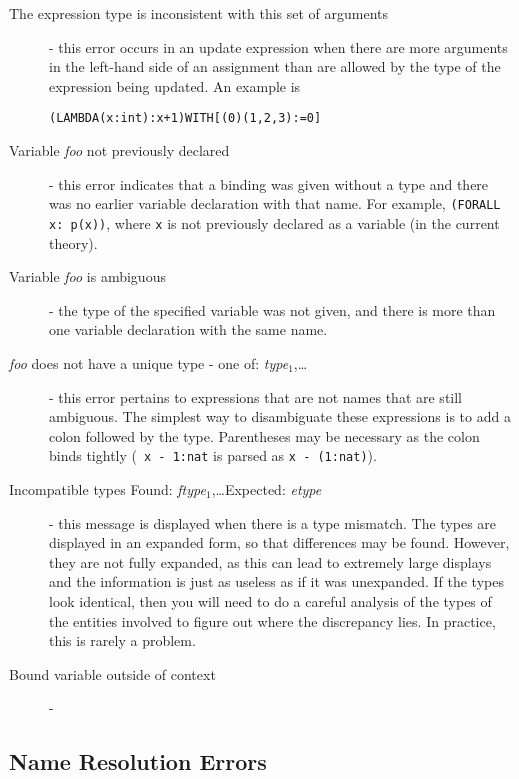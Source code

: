 \begin{description}
\item[The expression type is inconsistent with this set of arguments] -
this error occurs in an update expression when there are more arguments in
the left-hand side of an assignment than are allowed by the type of the
expression being updated.  An example is
{\small
\begin{alltt}
  (LAMBDA (x:int): x + 1) WITH [(0)(1,2,3) := 0]
\end{alltt}}

\item[Variable \emph{foo} not previously declared] - this error indicates
that a binding was given without a type and there was no earlier variable
declaration with that name.  For example, \texttt{(FORALL x: p(x))}, where
\texttt{x} is not previously declared as a variable (in the current
theory).

\item[Variable \emph{foo} is ambiguous] - the type of the specified
variable was not given, and there is more than one variable declaration
with the same name.

\item[{\em foo\/} does not have a unique type - one of: {\em
type$_1$\/},\ldots] - this error pertains to expressions that are not
names that are still ambiguous.  The simplest way to disambiguate these
expressions is to add a colon followed by the type.  Parentheses may be
necessary as the colon binds tightly (\eg\ \texttt{x - 1:nat} is parsed as
\texttt{x - (1:nat)}).

\item[Incompatible types Found: {\em ftype$_1$},\ldots Expected: {\em
etype\/}] - this message is displayed when there is a type mismatch.  The
types are displayed in an expanded form, so that differences may be found.
However, they are not fully expanded, as this can lead to extremely large
displays and the information is just as useless as if it was unexpanded.
If the types look identical, then you will need to do a careful analysis
of the types of the entities involved to figure out where the discrepancy
lies.  In practice, this is rarely a problem.

\item[Bound variable outside of context] - 

\end{description}


\subsection{Name Resolution Errors}

